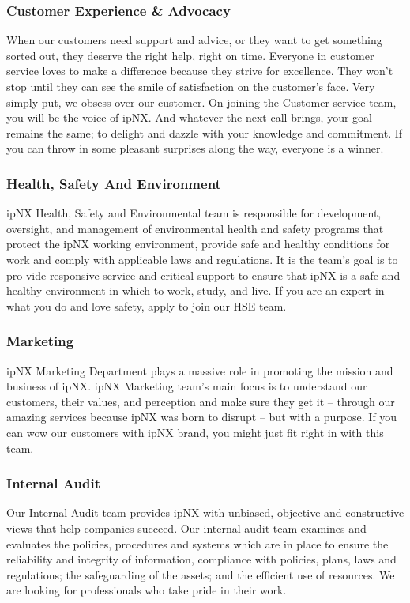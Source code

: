 \subsubsection{Customer Experience \& Advocacy}
When our customers need support and advice, or they want to get something sorted out, they deserve the right help, right on time. Everyone in customer service loves to make a difference because they strive for excellence. They won’t stop until they can see the smile of satisfaction on the customer’s face. Very simply put, we obsess over our customer. On joining the Customer service team, you will be the voice of ipNX. And whatever the next call brings, your goal remains the same; to delight and dazzle with your knowledge and commitment. If you can throw in some pleasant surprises along the way, everyone is a winner.
\subsubsection{Health, Safety And Environment}
ipNX Health, Safety and Environmental team is responsible for development, oversight, and management of environmental health and safety programs that protect the ipNX working environment, provide safe and healthy conditions for work and comply with applicable laws and regulations. It is the team's goal is to pro vide responsive service and critical support to ensure that ipNX is a safe and healthy environment in which to work, study, and live. If you are an expert in what you do and love safety, apply to join our HSE team.
\subsubsection{Marketing}
ipNX Marketing Department plays a massive role in promoting the mission and business of ipNX. ipNX Marketing team's main focus is to understand our customers, their values, and perception and make sure they get it – through our amazing services because ipNX was born to disrupt – but with a purpose.  If you can wow our customers with ipNX brand, you might just fit right in with this team.
\subsubsection{Internal Audit}
Our Internal Audit team provides ipNX with unbiased, objective and constructive views that help companies succeed. Our internal audit team examines and evaluates the policies, procedures and systems which are in place to ensure the reliability and integrity of information, compliance with policies, plans, laws and regulations; the safeguarding of the assets; and the efficient use of resources. We are looking for professionals who take pride in their work.
